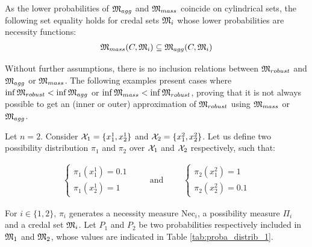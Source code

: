 As the lower probabilities of ${\mathfrak{M}}_{agg}$ and ${\mathfrak{M}}_{mass}$ coincide on cylindrical sets, the following set equality holds for credal sets ${\mathfrak{M}}_i$ whose lower probabilities are necessity functions:
\begin{eqnarray}\label{eq:inclusion_necessity}
    {\mathfrak{M}}_{mass}(C, {\mathfrak{M}}_i) \subseteq {\mathfrak{M}}_{agg}(C, {\mathfrak{M}}_i)
\end{eqnarray}

Without further assumptions, there is no inclusion relations between ${\mathfrak{M}}_{robust}$ and ${\mathfrak{M}}_{agg}$ or ${\mathfrak{M}}_{mass}$. The following examples present cases where $\inf{\mathfrak{M}}_{robust}<\inf{\mathfrak{M}}_{agg}$ or $\inf{\mathfrak{M}}_{mass}<\inf{\mathfrak{M}}_{robust}$, proving that it is not always possible to get an (inner or outer) approximation of ${\mathfrak{M}}_{robust}$ using ${\mathfrak{M}}_{mass}$ or ${\mathfrak{M}}_{agg}$.

\begin{example}\label{ex:necessity}
    Let $n=2$. Consider ${\mathcal{X}}_1=\{x^1_1, x^1_2\}$ and ${\mathcal{X}}_2=\{x^2_1, x^2_2\}$. Let us define two possibility distribution $\pi_1$ and $\pi_2$ over ${\mathcal{X}}_1$ and ${\mathcal{X}}_2$ respectively, such that:

    \begin{eqnarray*}
    \begin{cases}
        \pi_1(x^1_1) = 0.1\\
        \pi_1(x^1_2) = 1
    \end{cases}
    \qquad\text{ and }\qquad
    \begin{cases}
        \pi_2(x^2_1)=1\\
        \pi_2(x^2_2)=0.1
    \end{cases}
    \end{eqnarray*}
    
    For $i\in\{1,2\}$, $\pi_i$ generates a necessity measure $\mathrm{Nec}_i$, a possibility measure $\Pi_i$ and a credal set ${\mathfrak{M}}_i$. Let $P_1$ and $P_2$ be two probabilities respectively included in ${\mathfrak{M}}_1$ and ${\mathfrak{M}}_2$,  whose values are indicated in Table \ref{tab:proba_distrib_1}. 
    

\end{example}
